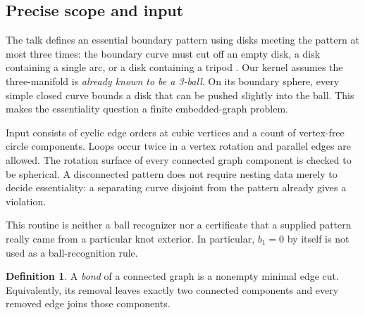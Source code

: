 \documentclass[11pt]{article}
\theoremstyle{definition}
\newtheorem{definition}[theorem]{Definition}
\begin{document}
\subsection{Precise scope and input}

The talk defines an essential boundary pattern using disks meeting the pattern
at most three times: the boundary curve must cut off an empty disk, a disk
containing a single arc, or a disk containing a tripod \cite[pp.~24--25]{slides}.
Our kernel assumes the three-manifold is \emph{already known to be a 3-ball}.
On its boundary sphere, every simple closed curve bounds a disk that can be
pushed slightly into the ball. This makes the essentiality question a finite
embedded-graph problem.

Input consists of cyclic edge orders at cubic vertices and a count of
vertex-free circle components. Loops occur twice in a vertex rotation and
parallel edges are allowed. The rotation surface of every connected graph
component is checked to be spherical. A disconnected pattern does not require
nesting data merely to decide essentiality: a separating curve disjoint from
the pattern already gives a violation.

This routine is neither a ball recognizer nor a certificate that a supplied
pattern really came from a particular knot exterior. In particular, $b_1=0$
by itself is not used as a ball-recognition rule.

\begin{definition}
A \emph{bond} of a connected graph is a nonempty minimal edge cut. Equivalently,
its removal leaves exactly two connected components and every removed edge
joins those components.
\end{definition}
\end{document}
